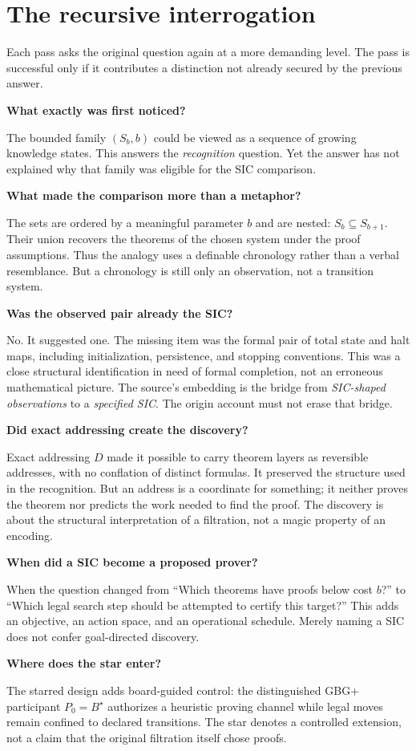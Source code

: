\documentclass[11pt,letterpaper]{article}
\newcommand{\qline}[2]{\medskip\noindent{\color{accent}\textbf{Pass #1.}}\quad\textbf{#2}\par}
\begin{document}
\section{The recursive interrogation}
Each pass asks the original question again at a more demanding level. The pass is successful only if it contributes a distinction not already secured by the previous answer.

\qline{0}{What exactly was first noticed?}
The bounded family $(S_b,b)$ could be viewed as a sequence of growing knowledge states. This answers the \emph{recognition} question. Yet the answer has not explained why that family was eligible for the SIC comparison.

\qline{1}{What made the comparison more than a metaphor?}
The sets are ordered by a meaningful parameter $b$ and are nested: $S_b\subseteq S_{b+1}$. Their union recovers the theorems of the chosen system under the proof assumptions. Thus the analogy uses a definable chronology rather than a verbal resemblance. But a chronology is still only an observation, not a transition system.

\qline{2}{Was the observed pair already the SIC?}
No. It suggested one. The missing item was the formal pair of total state and halt maps, including initialization, persistence, and stopping conventions. This was a close structural identification in need of formal completion, not an erroneous mathematical picture. The source's embedding is the bridge from \emph{SIC-shaped observations} to a \emph{specified SIC}. The origin account must not erase that bridge.

\qline{3}{Did exact addressing create the discovery?}
Exact addressing $D$ made it possible to carry theorem layers as reversible addresses, with no conflation of distinct formulas. It preserved the structure used in the recognition. But an address is a coordinate for something; it neither proves the theorem nor predicts the work needed to find the proof. The discovery is about the structural interpretation of a filtration, not a magic property of an encoding.

\qline{4}{When did a SIC become a proposed prover?}
When the question changed from ``Which theorems have proofs below cost $b$?'' to ``Which legal search step should be attempted to certify this target?'' This adds an objective, an action space, and an operational schedule. Merely naming a SIC does not confer goal-directed discovery.

\qline{5}{Where does the star enter?}
The starred design adds board-guided control: the distinguished GBG+ participant $P_0=B^{\star}$ authorizes a heuristic proving channel while legal moves remain confined to declared transitions. The star denotes a controlled extension, not a claim that the original filtration itself chose proofs.
\end{document}
